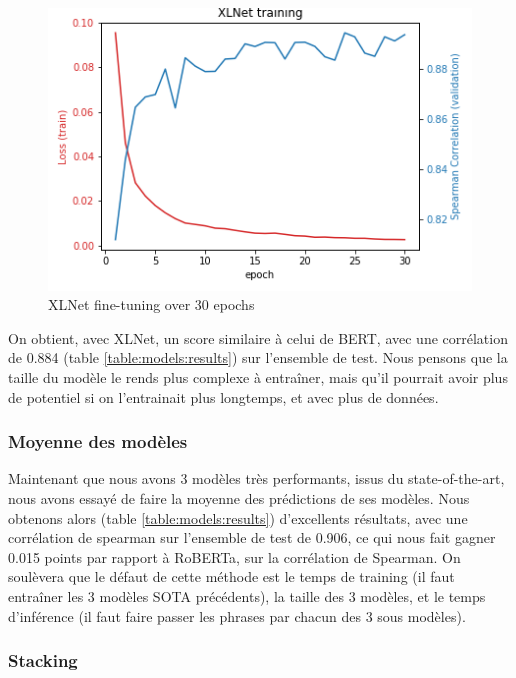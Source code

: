 \documentclass[11pt,a4paper, french]{article}
\begin{document}
\begin{figure}
  \includegraphics[width=\linewidth]{resources/XLNet-training.png}
  \caption{XLNet fine-tuning over 30 epochs}
  \label{fig:XLNet:finetunning}
\end{figure}

On obtient, avec XLNet, un score similaire à celui de BERT, avec une corrélation de 0.884 (table \ref{table:models:results}) sur l'ensemble de test. Nous pensons que la taille du modèle le rends plus complexe à entraîner, mais qu'il pourrait avoir plus de potentiel si on l'entrainait plus longtemps, et avec plus de données.

%
\subsubsection{Moyenne des modèles}

Maintenant que nous avons 3 modèles très performants, issus du state-of-the-art, nous avons essayé de faire la moyenne des prédictions de ses modèles. Nous obtenons alors (table \ref{table:models:results}) d'excellents résultats, avec une corrélation de spearman sur l'ensemble de test de 0.906, ce qui nous fait gagner 0.015 points par rapport à RoBERTa, sur la corrélation de Spearman. On soulèvera que le défaut de cette méthode est le temps de training (il faut entraîner les 3 modèles SOTA précédents), la taille des 3 modèles, et le temps d'inférence (il faut faire passer les phrases par chacun des 3 sous modèles).

%
\subsubsection{Stacking}
\end{document}
